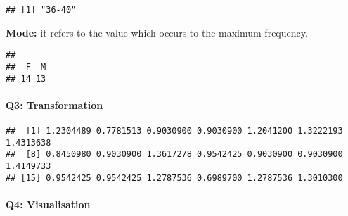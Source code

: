 \documentclass[
]{article}
\newenvironment{Shaded}{\begin{snugshade}}{\end{snugshade}}
\newcommand{\CommentTok}[1]{\textcolor[rgb]{0.56,0.35,0.01}{\textit{#1}}}
\newcommand{\DataTypeTok}[1]{\textcolor[rgb]{0.13,0.29,0.53}{#1}}
\newcommand{\DecValTok}[1]{\textcolor[rgb]{0.00,0.00,0.81}{#1}}
\newcommand{\KeywordTok}[1]{\textcolor[rgb]{0.13,0.29,0.53}{\textbf{#1}}}
\newcommand{\NormalTok}[1]{#1}
\newcommand{\OperatorTok}[1]{\textcolor[rgb]{0.81,0.36,0.00}{\textbf{#1}}}
\newcommand{\OtherTok}[1]{\textcolor[rgb]{0.56,0.35,0.01}{#1}}
\newcommand{\StringTok}[1]{\textcolor[rgb]{0.31,0.60,0.02}{#1}}
\begin{document}
\begin{Shaded}
\end{Shaded}

\begin{verbatim}
## [1] "36-40"
\end{verbatim}

\textbf{Mode:} it refers to the value which occurs to the maximum
frequency.

\begin{Shaded}
\end{Shaded}

\begin{verbatim}
## 
##  F  M 
## 14 13
\end{verbatim}

\hypertarget{q3-transformation}{%
\paragraph{Q3: Transformation}\label{q3-transformation}}

\begin{Shaded}
\end{Shaded}

\begin{verbatim}
##  [1] 1.2304489 0.7781513 0.9030900 0.9030900 1.2041200 1.3222193 1.4313638
##  [8] 0.8450980 0.9030900 1.3617278 0.9542425 0.9030900 0.9030900 1.4149733
## [15] 0.9542425 0.9542425 1.2787536 0.6989700 1.2787536 1.3010300
\end{verbatim}

\hypertarget{q4-visualisation}{%
\paragraph{Q4: Visualisation}\label{q4-visualisation}}
\end{document}
